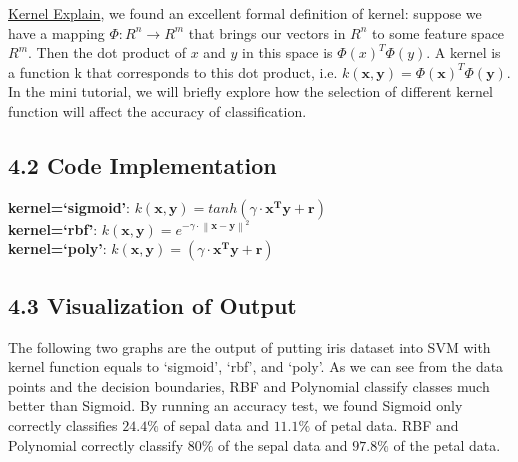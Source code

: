 \documentclass[12pt]{article}
\begin{document}
\href{https://stats.stackexchange.com/questions/152897/how-to-intuitively-explain-what-a-kernel-is}{Kernel Explain}, we found an excellent formal definition of kernel: suppose we have a mapping $\Phi:R^n \rightarrow R^m$ that brings our vectors in $R^n$ to some feature space $R^m$. Then the dot product of $x$ and $y$ in this space is $\Phi(x)^T \Phi(y)$. 
A kernel is a function k that corresponds to this dot product, i.e. $k(\mathbf{x},\mathbf{y}) = \Phi(\mathbf{x})^T \Phi(\mathbf{y})$. In the mini tutorial, we will briefly explore how the selection of different kernel function will affect the accuracy of classification.

\subsection*{4.2 Code Implementation}
\textbf{kernel=`sigmoid'}: $k(\mathbf{x},\mathbf{y}) = tanh(\gamma \cdot \mathbf{x^T}\mathbf{y}+\mathbf{r})$ \\
\textbf{kernel=`rbf'}: $k(\mathbf{x},\mathbf{y}) = e^{-\gamma \cdot \left\|\mathbf{x}-\mathbf{y}\right\|^2}$ \\
\textbf{kernel=`poly'}: $k(\mathbf{x},\mathbf{y}) = (\gamma \cdot \mathbf{x^T y} + \mathbf{r})$

\subsection*{4.3 Visualization of Output}
The following two graphs are the output of putting iris dataset into SVM with kernel function equals to `sigmoid', `rbf', and `poly'. As we can see from the data points and the decision boundaries, RBF and Polynomial classify classes much better than Sigmoid. By running an accuracy test, we found Sigmoid only correctly classifies $24.4\%$ of sepal data and $11.1\%$ of petal data.
RBF and Polynomial correctly classify $80\%$ of the sepal data and $97.8\%$ of the petal data. 
\end{document}
